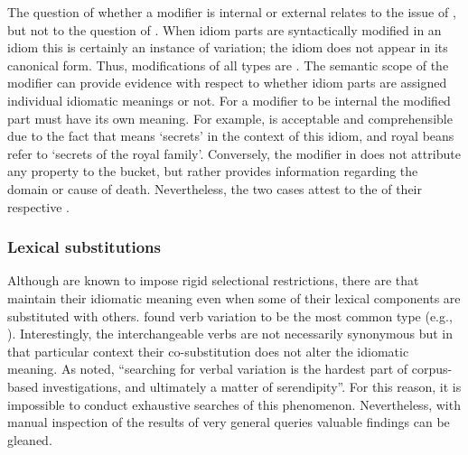 \documentclass[output=paper]{langsci/langscibook}
\begin{document}
\eal
\zl

The question of whether a modifier is internal or external relates to the issue of , but not to the question of . When idiom parts are syntactically modified in an idiom this is certainly an instance of variation; the idiom does not appear in its canonical form. Thus, modifications of all types are . The semantic scope of the modifier can provide evidence with respect to whether idiom parts are assigned individual idiomatic meanings or not. For a modifier to be internal the modified part must have its own meaning. For example,  is acceptable and comprehensible due to the fact that  means `secrets' in the context of this idiom, and royal beans refer to `secrets of the royal family'. Conversely, the modifier in  does not attribute any property to the bucket, but rather provides information regarding the domain or cause of death. Nevertheless, the two cases attest to the  of their respective .


\subsubsection{Lexical substitutions}

Although  are known to impose rigid selectional restrictions, there are  that maintain their idiomatic meaning even when some of their lexical components are substituted with others. \citet{moon98} found verb variation to be the most
common type (e.g., ). Interestingly, the interchangeable verbs are not necessarily synonymous but in that particular context their co-substitution does not alter the idiomatic meaning. As \citet[p. 50]{moon98} noted, ``searching for verbal variation is the hardest part of corpus-based investigations, and ultimately a matter of serendipity''. For this reason, it is impossible to conduct exhaustive searches of this phenomenon. Nevertheless, with manual inspection of the results of very general queries valuable findings can be gleaned.
\end{document}
